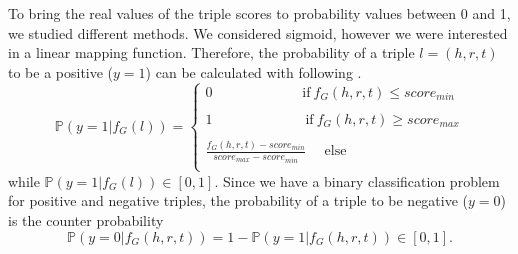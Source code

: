 To bring the real values of the triple scores to probability values between 0 and 1, we studied different methods.
We considered sigmoid, however we were interested in a linear mapping function.
Therefore, the probability of a triple $l = (h, r, t)$ to be a positive ($y = 1$) can be calculated with following .
\begin{equation}  \label{eqn:positive_probability}
    \mathds{P}(y = 1|f_G(l)) =
    \begin{cases}
        0 \ \ \ \ \ \ \ \ \ \ \ \ \ \ \ \ \ \ \ \ \ \ \ \ \ \ \  \ \   
         \text{if} \  f_G(h,r,t) \leq score_{min}
         
        \\ \\
        1 \ \ \ \ \ \ \ \ \ \ \ \ \ \ \ \ \ \ \ \ \ \ \ \ \ \ \   \ \ \
        \text{if} \ f_G(h,r,t) \geq score_{max}
         
        \\ \\
        \frac{f_G(h,r,t) - score_{min}}{score_{max} - score_{min}}
        \ \ \ \ \ \ 
         \text{else}
        \\
    \end{cases} 
\end{equation}
while $\mathds{P}(y = 1|f_G(l)) \in [0, 1]$.
Since we have a binary classification problem for positive and negative triples, the probability of a triple to be negative ($y=0$) is the counter probability
\begin{equation} \label{eqn:negative_probability}
    \mathds{P}(y = 0 | f_G(h, r, t)) = 1 - \mathds{P}(y = 1| f_G(h, r, t)) \in [0,1].
\end{equation}